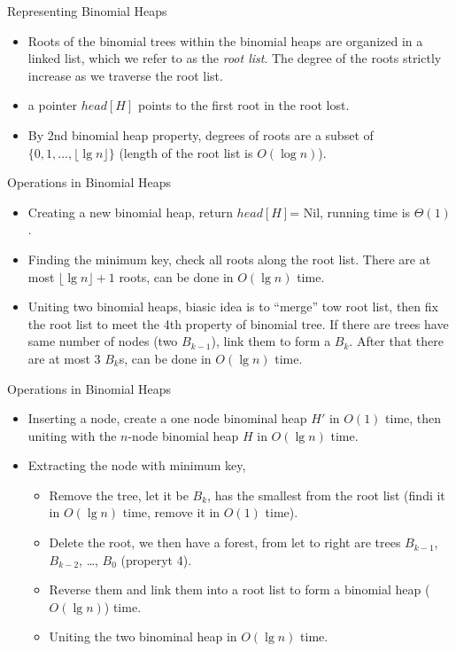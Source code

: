 \documentclass{beamer}
\begin{document}
\begin{frame}{}
\centerline{\large Representing Binomial Heaps} 
\vspace {0.5cm}
\begin{itemize}
\item Roots of the binomial trees within the binomial heaps are organized in a linked list, which we refer to as the {\it root list}. 
The degree of the roots strictly increase as we traverse the root list. 
\item a pointer $head[H]$ points to the first root in the root lost. 
\item By 2nd binomial heap property, degrees of roots are a subset of $\{ 0,1,\ldots, \lfloor \lg n\rfloor\}$ (length of the root list
is $O(\log n)$).
\end{itemize}
\end{frame}

\begin{frame}{}
\centerline{\large Operations in Binomial Heaps}
\vspace{0.5cm}
\begin{itemize}
\item Creating a new binomial heap, return $head[H]$={ Nil}, running time is $\Theta(1)$.
\item Finding the minimum key, check all roots along the root list. There are at most $\lfloor \lg n\rfloor +1 $ roots,
can be done in $O(\lg n)$ time. 
\item Uniting two binomial heaps, biasic idea is to ``merge'' tow root list, then fix the root list
to meet the 4th property of binomial tree. If there are trees have same number of nodes (two $B_{k-1}$), link them
to form a $B_k$. After that there are at most 3 $B_k$s, can be done in $O(\lg n)$ time. 
\end{itemize}
\end{frame}

\begin{frame}{}
\centerline{\large Operations in Binomial Heaps}
\vspace{0.2cm}
\begin{itemize}
\item Inserting a node, create a one node binominal heap $H'$ in $O(1)$ time, then uniting with the $n$-node binomial heap
 $H$ in $O(\lg n)$ time. 
\item Extracting the node with minimum key, 
\begin{itemize}
\item Remove the tree, let it be $B_k$, has the smallest from the root list (findi it in $O(\lg n)$ time, remove it in $O(1)$ time). 
\item Delete the root, we then have a forest, from let to right are trees $B_{k-1}$, $B_{k-2}$, \ldots, $B_0$ (properyt 4). 
\item Reverse them and link them into a root list to form a binomial heap ($O(\lg n)$) time.
\item Uniting the two binominal heap in $O(\lg n)$ time. 
\end{itemize}
\end{itemize}
\end{frame}
\end{document}
